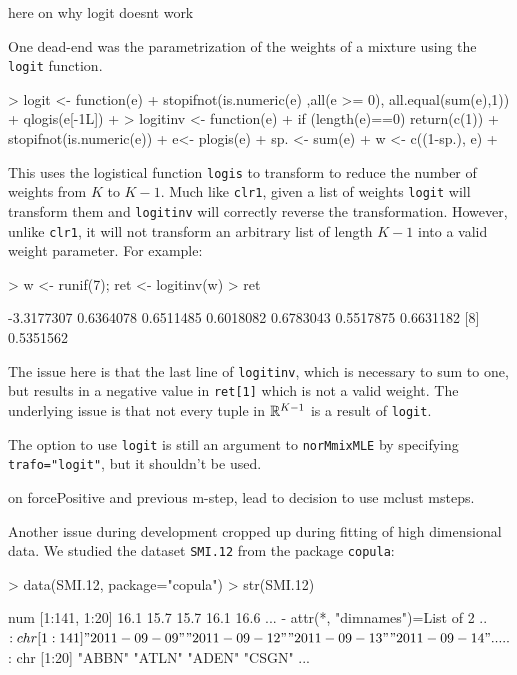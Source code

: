 here on why logit doesnt work

One dead-end was the parametrization of the weights of a mixture using the 
{\tt logit} function.

\begin{Schunk}
\begin{Sinput}
> logit <- function(e) {
+     stopifnot(is.numeric(e) ,all(e >= 0), all.equal(sum(e),1))
+     qlogis(e[-1L])
+ }
> logitinv <- function(e) {
+     if (length(e)==0) {return(c(1))}
+     stopifnot(is.numeric(e))
+     e<- plogis(e)
+     sp. <- sum(e)
+     w <- c((1-sp.), e)
+ }
\end{Sinput}
\end{Schunk}

This uses the logistical function {\tt logis} to transform to reduce the number
of weights from $K$ to $K-1$. Much like {\tt clr1}, given a list of weights 
{\tt logit} will transform them and {\tt logitinv} will correctly reverse the 
transformation. However, unlike {\tt clr1}, it will not transform an arbitrary 
list of length $K-1$ into a valid weight parameter. For example:

\begin{Schunk}
\begin{Sinput}
> w <- runif(7); ret <- logitinv(w)
> ret
\end{Sinput}
\begin{Soutput}
[1] -3.3177307  0.6364078  0.6511485  0.6018082  0.6783043  0.5517875  0.6631182
[8]  0.5351562
\end{Soutput}
\end{Schunk}

The issue here is that the last line of {\tt logitinv}, which is necessary to 
sum to one, but results in a negative value in {\tt ret[1]} which is not a 
valid weight. The underlying issue is that not every tuple in $\mathbb{R}^{K-1}$ is 
a result of {\tt logit}.

The option to use {\tt logit} is still an argument to {\tt norMmixMLE} by 
specifying {\tt trafo="logit"}, but it shouldn't be used.

on forcePositive and previous m-step, lead to decision to use mclust msteps.

Another issue during development cropped up during fitting of high dimensional
data. We studied the dataset {\tt SMI.12} from the package {\tt copula}:

\begin{Schunk}
\begin{Sinput}
> data(SMI.12, package="copula")
> str(SMI.12)
\end{Sinput}
\begin{Soutput}
 num [1:141, 1:20] 16.1 15.7 15.7 16.1 16.6 ...
 - attr(*, "dimnames")=List of 2
  ..$ : chr [1:141] "2011-09-09" "2011-09-12" "2011-09-13" "2011-09-14" ...
  ..$ : chr [1:20] "ABBN" "ATLN" "ADEN" "CSGN" ...
\end{Soutput}
\end{Schunk}

